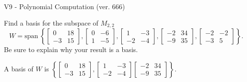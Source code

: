 \begin{exercise}
  \begin{exerciseTitle}V9 - Polynomial Computation (ver. 666)\end{exerciseTitle}
  \begin{exerciseStatement}
    Find a basis for the subspace of \(M_{2,2}\) 
\[W=\mathrm{span}\ \left\{\left[\begin{array}{cc}
0 & 18 \\
-3 & 15
\end{array}\right] , \left[\begin{array}{cc}
0 & -6 \\
1 & -5
\end{array}\right] , \left[\begin{array}{cc}
1 & -3 \\
-2 & -4
\end{array}\right] , \left[\begin{array}{cc}
-2 & 34 \\
-9 & 35
\end{array}\right] , \left[\begin{array}{cc}
-2 & -2 \\
-3 & 5
\end{array}\right]\right\}.\]
 Be sure to explain why your result is a basis.


  \end{exerciseStatement}
  \begin{exerciseAnswer}
   A basis of \(W\) is  \(\left\{\left[\begin{array}{cc}
0 & 18 \\
-3 & 15
\end{array}\right] , \left[\begin{array}{cc}
1 & -3 \\
-2 & -4
\end{array}\right] \left[\begin{array}{cc}
-2 & 34 \\
-9 & 35
\end{array}\right]\right\}\).
  


  \end{exerciseAnswer}
\end{exercise}